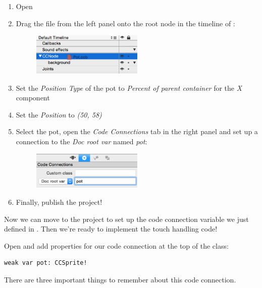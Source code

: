 \begin{leftbar}
\begin{enumerate}
  \item Open 
  \item Drag the  file from the left panel onto the root
  node in the timeline of :
    \begin{figure}[H]
    \centering
    \includegraphics[width=150pt]{images/Chapter3/drag_pot_ccb.png}
  \end{figure}
  \item Set the \textit{Position Type} of the pot to \textit{Percent of parent
  container} for the \textit{X} component
  \item Set the \textit{Position} to \textit{(50, 58)}
  \item Select the pot, open the \textit{Code Connections} tab in the right
  panel and set up a connection to the \textit{Doc root var} named
  \textit{pot}:
  \begin{figure}[H]
    \centering
    \includegraphics[width=150pt]{images/Chapter3/pot_cc.png}
  \end{figure}
  \item Finally, publish the \SB{} project!
\end{enumerate}
\end{leftbar}

Now we can move to the \xcode{} project to set up the code connection variable
we just defined in \SB{}. Then we're ready to implement the touch handling
code!

\begin{leftbar}
Open  and add properties for our code
connection at the top of the class:
\begin{lstlisting}
weak var pot: CCSprite!
\end{lstlisting}
\end{leftbar}
There are three important things to remember about this code connection.

